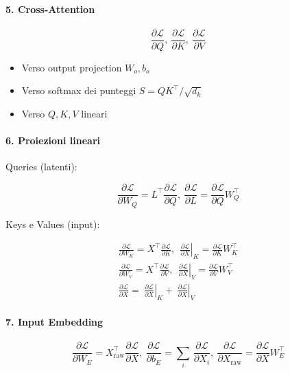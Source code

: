 \documentclass[
  11pt,
]{article}
\begin{document}
\paragraph{5. Cross-Attention}

\[\frac{\partial\mathcal{L}}{\partial Q},\ \frac{\partial\mathcal{L}}{\partial K},\ \frac{\partial\mathcal{L}}{\partial V}\]

\begin{itemize}
\item
  Verso output projection \(W_{o},b_{o}\)
\item
  Verso softmax dei punteggi \(S = QK^{\top}/\sqrt{d_{k}}\)
\item
  Verso \(Q,K,V\) lineari
\end{itemize}

\paragraph{6. Proiezioni lineari}

Queries (latenti):

\[\frac{\partial\mathcal{L}}{\partial W_{Q}} = L^{\top}\frac{\partial\mathcal{L}}{\partial Q},\ \frac{\partial\mathcal{L}}{\partial L} = \frac{\partial\mathcal{L}}{\partial Q}W_{Q}^{\top}\]

Keys e Values (input):

\[\begin{matrix}
\frac{\partial\mathcal{L}}{\partial W_{K}} = X^{\top}\frac{\partial\mathcal{L}}{\partial K},\left. \ \ \frac{\partial\mathcal{L}}{\partial X} \right|_{K} = \frac{\partial\mathcal{L}}{\partial K}W_{K}^{\top} \\
\frac{\partial\mathcal{L}}{\partial W_{V}} = X^{\top}\frac{\partial\mathcal{L}}{\partial V},\left. \ \ \frac{\partial\mathcal{L}}{\partial X} \right|_{V} = \frac{\partial\mathcal{L}}{\partial V}W_{V}^{\top} \\
\frac{\partial\mathcal{L}}{\partial X} = \left. \ \frac{\partial\mathcal{L}}{\partial X} \right|_{K} + \left. \ \frac{\partial\mathcal{L}}{\partial X} \right|_{V}
\end{matrix}\]

\paragraph{7. Input Embedding}

\[\frac{\partial\mathcal{L}}{\partial W_{E}} = X_{\text{raw}}^{\top}\frac{\partial\mathcal{L}}{\partial X},\ \frac{\partial\mathcal{L}}{\partial b_{E}} = \sum_{i}^{}\,\frac{\partial\mathcal{L}}{\partial X_{i}},\ \frac{\partial\mathcal{L}}{\partial X_{\text{raw}}} = \frac{\partial\mathcal{L}}{\partial X}W_{E}^{\top}\]
\end{document}
